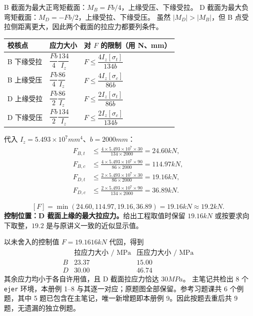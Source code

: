 \documentclass[a4paper,10pt,fontset=none]{ctexart}
\begin{document}
\clearpage
{}
B 截面为最大正弯矩截面：$M_B=Fb/4$，上缘受压、下缘受拉。
D 截面为最大负弯矩截面：$M_D=-Fb/2$，上缘受拉、下缘受压。
虽然 $|M_D|>|M_B|$，但 B 点受拉侧距离更大，因此两个截面的拉应力都要列条件。
\vspace{2mm}
\par\begin{tabularx}{\linewidth}{@{}lXX@{}}
\toprule
校核点 & 应力大小 & 对 $F$ 的限制（用 N、mm）\\\midrule
B 下缘受拉 & $\dfrac{Fb}{4}\dfrac{134}{I_z}$ & $F\le\dfrac{4I_z[\sigma_t]}{134b}$\\[7pt]
B 上缘受压 & $\dfrac{Fb}{4}\dfrac{86}{I_z}$ & $F\le\dfrac{4I_z[\sigma_c]}{86b}$\\[7pt]
D 上缘受拉 & $\dfrac{Fb}{2}\dfrac{86}{I_z}$ & $F\le\dfrac{2I_z[\sigma_t]}{86b}$\\[7pt]
D 下缘受压 & $\dfrac{Fb}{2}\dfrac{134}{I_z}$ & $F\le\dfrac{2I_z[\sigma_c]}{134b}$\\[5pt]\bottomrule
\end{tabularx}\par
{}
代入 $I_z=5.493\times10^7\unit{mm^4}$、$b=2000\unit{mm}$：
\[
\begin{aligned}
F_{B,t}&\le\frac{4\times5.493\times10^7\times30}{134\times2000}
=24.60\unit{kN},\\[4pt]
F_{B,c}&\le\frac{4\times5.493\times10^7\times90}{86\times2000}
=114.97\unit{kN},\\[4pt]
F_{D,t}&\le\frac{2\times5.493\times10^7\times30}{86\times2000}
=19.16\unit{kN},\\[4pt]
F_{D,c}&\le\frac{2\times5.493\times10^7\times90}{134\times2000}
=36.89\unit{kN}.
\end{aligned}
\]
\begin{answerbox}
\[
\boxed{[F]=\min(24.60,114.97,19.16,36.89)=19.16\unit{kN}\approx19.2\unit{kN}}.
\]
\textbf{控制位置：D 截面上缘的最大拉应力。}给出工程取值时保留 $19.16\unit{kN}$ 或按要求向下取整，$19.2$ 是与原讲义一致的近似显示值。
\end{answerbox}
以未舍入的控制值 $F=19.1616\unit{kN}$ 代回，得到
\[
\begin{array}{c|cc}
&\text{拉应力大小 / MPa}&\text{压应力大小 / MPa}\\\hline
B&23.37&15.00\\
D&30.00&46.74
\end{array}
\]
其余应力均小于各自许用值，且 D 截面拉应力恰达 $30\unit{MPa}$。
主笔记共检出 8 个 \texttt{ejer} 环境，本册例 1--8 与其逐一对应；原题图全部保留。参考习题课共 6 个例题，其中 5 题已包含在主笔记，唯一新增题即本册例 9。因此按题去重后共 9 题，无遗漏的独立例题。
\end{document}
